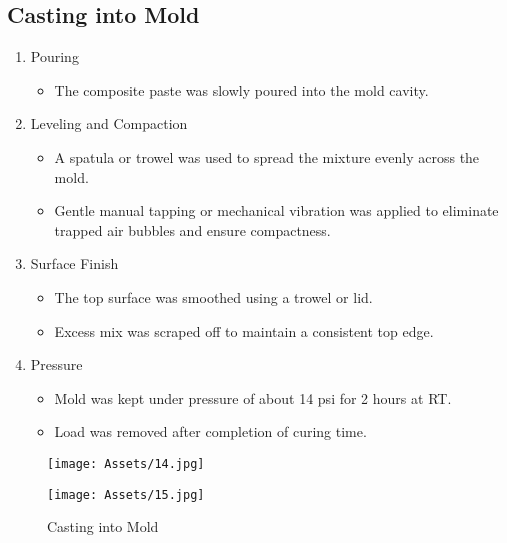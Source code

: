 \subsection{Casting into Mold}
\begin{enumerate}
	\item  Pouring
	      \begin{itemize}
		      \item The composite paste was slowly poured into the mold cavity.
	      \end{itemize}
	\item  Leveling and Compaction
	      \begin{itemize}
		      \item A spatula or trowel was used to spread the mixture evenly across the mold.
		      \item Gentle manual tapping or mechanical vibration was applied to eliminate trapped air bubbles and ensure compactness.
	      \end{itemize}
	\item Surface Finish
	      \begin{itemize}
		      \item The top surface was smoothed using a trowel or lid.
		      \item Excess mix was scraped off to maintain a consistent top edge.
	      \end{itemize}
	\item Pressure
	      \begin{itemize}
		      \item Mold was kept under pressure of about 14 psi for 2 hours at RT.
		      \item Load was removed after completion of curing time.
	      \end{itemize}
\end{enumerate}

\begin{figure}[H]
	\centering
	\begin{minipage}{0.48\textwidth}
		\centering
		\texttt{[image: Assets/14.jpg]}
	\end{minipage}
	\hfill
	\begin{minipage}{0.48\textwidth}
		\centering
		\texttt{[image: Assets/15.jpg]}
	\end{minipage}
	\caption{Casting into Mold}
\end{figure}

